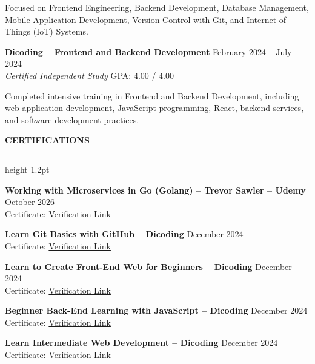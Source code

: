 \documentclass[11pt,a4paper]{article}
\newcommand{\secfontsize}{14}
\newcommand{\seclineheight}{1.2pt}
\newcommand{\secgapabove}{14pt}
\newcommand{\secgaptitle}{6pt}
\newcommand{\secgapbelow}{10pt}
\newcommand{\cvsection}[1]{%
    \par\vspace{\secgapabove}%
    {\fontsize{\secfontsize}{\numexpr\secfontsize+3\relax}\selectfont\bfseries\scshape #1}\par
    \vspace{\secgaptitle}%
    {\color{black}\hrule height \seclineheight}%
    \vspace{\secgapbelow}%
    \noindent\ignorespaces
}
\begin{document}
Focused on Frontend Engineering, Backend Development, Database Management, Mobile Application Development, Version Control with Git, and Internet of Things (IoT) Systems.

\vspace{6pt}

\textbf{Dicoding -- Frontend and Backend Development}
\hfill
February 2024 -- July 2024 \\
\textit{Certified Independent Study} \hfill GPA: 4.00 / 4.00

Completed intensive training in Frontend and Backend Development, including web application development, JavaScript programming, React, backend services, and software development practices.


\cvsection{CERTIFICATIONS}
\textbf{Working with Microservices in Go (Golang) -- Trevor Sawler -- Udemy}
\hfill October 2026 \\
Certificate: \href{https://www.udemy.com/certificate/UC-35a6feca-5e9a-489b-abd2-3a4fb11bfc29/}{Verification Link}

\vspace{5pt}

\textbf{Learn Git Basics with GitHub -- Dicoding}
\hfill December 2024 \\
Certificate: \href{https://www.dicoding.com/certificates/6RPNV0G88Z2M}{Verification Link}

\vspace{5pt}

\textbf{Learn to Create Front-End Web for Beginners -- Dicoding}
\hfill December 2024 \\
Certificate: \href{https://www.dicoding.com/certificates/1OP8N900QXQK}{Verification Link}

\vspace{5pt}

\textbf{Beginner Back-End Learning with JavaScript -- Dicoding}
\hfill December 2024 \\
Certificate: \href{https://www.dicoding.com/certificates/1OP8WDO28XQK}{Verification Link}

\vspace{5pt}

\textbf{Learn Intermediate Web Development -- Dicoding}
\hfill December 2024 \\
Certificate: \href{https://www.dicoding.com/certificates/N9ZOY14GDPG5}{Verification Link}
\end{document}

